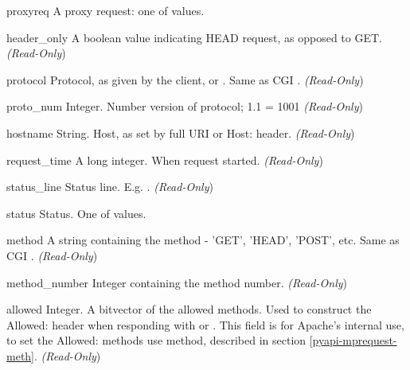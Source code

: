 \begin{memberdesc}[request]{proxyreq}
  A proxy request: one of  values.
\end{memberdesc}

\begin{memberdesc}[request]{header_only}
  A boolean value indicating HEAD request, as opposed to GET. 
  \emph{(Read-Only})
\end{memberdesc}

\begin{memberdesc}[request]{protocol}
  Protocol, as given by the client, or . Same as CGI .
  \emph{(Read-Only})
\end{memberdesc}

\begin{memberdesc}[request]{proto_num}
  Integer. Number version of protocol; 1.1 = 1001 
  \emph{(Read-Only})
\end{memberdesc}

\begin{memberdesc}[request]{hostname}
  String. Host, as set by full URI or Host: header.
  \emph{(Read-Only})
\end{memberdesc}

\begin{memberdesc}[request]{request_time}
  A long integer. When request started.
  \emph{(Read-Only})
\end{memberdesc}

\begin{memberdesc}[request]{status_line}
  Status line. E.g. . 
  \emph{(Read-Only})
\end{memberdesc}

\begin{memberdesc}[request]{status}
  Status. One of  values.
\end{memberdesc}

\begin{memberdesc}[request]{method}
  A string containing the method - 'GET', 'HEAD', 'POST', etc.
  Same as CGI .
  \emph{(Read-Only})
\end{memberdesc}

\begin{memberdesc}[request]{method_number}
  Integer containing the method number.
  \emph{(Read-Only})
\end{memberdesc}

\begin{memberdesc}[request]{allowed}
  Integer. A bitvector of the allowed methods. Used to construct the
  Allowed: header when responding with
   or
  . This field is for Apache's internal
  use, to set the Allowed: methods use 
  method, described in section \ref{pyapi-mprequest-meth}. 
  \emph{(Read-Only})
\end{memberdesc}

